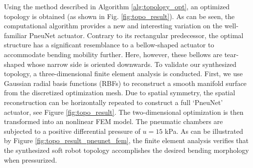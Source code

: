 Using the method described in Algorithm \ref{alg:topology_opt}, an optimized topology is obtained (as shown in Fig. \ref{fig:topo_result}). As can be seen, the computational algorithm provides a new and interesting variation on the well-familiar PneuNet actuator. Contrary to its rectangular predecessor, the optimal structure has a significant resemblance to a bellow-shaped actuator to accommodate bending mobility further. Here, however, these bellows are tear-shaped whose narrow side is oriented downwards. To validate our synthesized topology, a three-dimensional finite element analysis is conducted. First, we use Gaussian radial basis functions (RBFs) to reconstruct a smooth manifold surface from the discretized optimization mesh. Due to spatial symmetry, the spatial reconstruction can be horizontally repeated to construct a full `PneuNet' actuator, see Figure \ref{fig:topo_result}. The two-dimensional optimization is then transformed into an nonlinear FEM model. The pneumatic chambers are subjected to a positive differential pressure of $u = 15$ kPa. As can be illustrated by Figure \ref{fig:topo_result_pneunet_fem}, the finite element analysis verifies that the synthesized soft robot topology accomplishes the desired bending morphology when pressurized.

